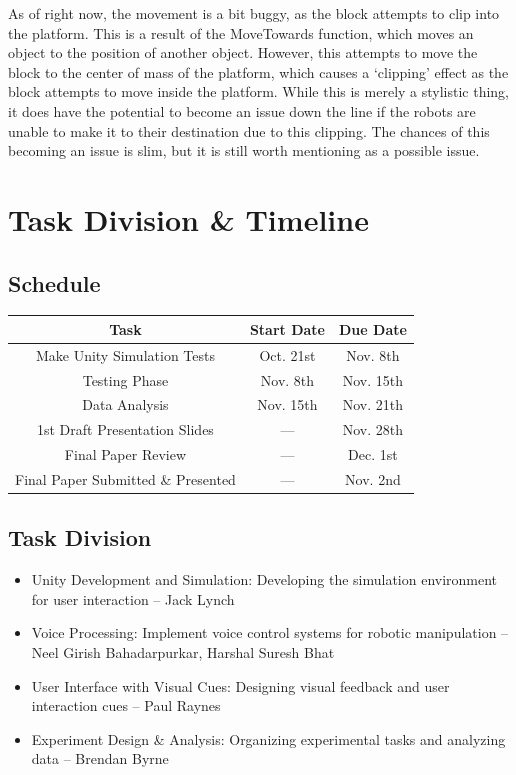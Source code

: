 \documentclass[conference]{IEEEtran}
\begin{document}
As of right now, the movement is a bit buggy, as the block attempts to clip into the platform. This is a result of the MoveTowards function, which moves an object to the position of another object. However, this attempts to move the block to the center of mass of the platform, which causes a ‘clipping’ effect as the block attempts to move inside the platform. While this is merely a stylistic thing, it does have the potential to become an issue down the line if the robots are unable to make it to their destination due to this clipping. The chances of this becoming an issue is slim, but it is still worth mentioning as a possible issue.

\section{Task Division \& Timeline}
\subsection{Schedule}
\begin{table}[htbp]
\begin{center}
\begin{tabular}{|c|c|c|}
\hline
\textbf{Task} & \textbf{Start Date} & \textbf{Due Date} \\
\hline
Make Unity Simulation Tests & Oct. 21st & Nov. 8th \\
\hline
Testing Phase & Nov. 8th & Nov. 15th \\
\hline
Data Analysis & Nov. 15th & Nov. 21th \\
\hline
1st Draft Presentation Slides & --- & Nov. 28th \\
\hline
Final Paper Review & --- & Dec. 1st \\
\hline
Final Paper Submitted \& Presented & --- & Nov. 2nd \\
\hline
\end{tabular}
\label{tab1}
\end{center}
\end{table}

\subsection{Task Division}
\begin{itemize}
\item Unity Development and Simulation: Developing the simulation environment for user interaction – Jack Lynch 
\item Voice Processing: Implement voice control systems for robotic manipulation – Neel Girish Bahadarpurkar, Harshal Suresh Bhat 
\item User Interface with Visual Cues: Designing visual feedback and user interaction cues – Paul Raynes 
\item Experiment Design \& Analysis: Organizing experimental tasks and analyzing data – Brendan Byrne 
\end{itemize}



\end{document}
